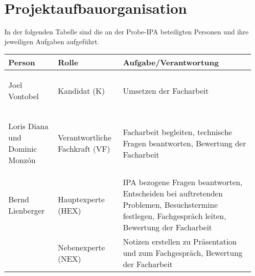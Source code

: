 \chapter{Projektaufbauorganisation}\label{ch:projektaufbauorganisation}
In der folgenden Tabelle sind die an der Probe-IPA beteiligten Personen und ihre jeweiligen Aufgaben aufgeführt.

\renewcommand{\arraystretch}{1.5}
\begin{longtable}{|p{}|p{}|p{}|}
    \hline
    \textbf{Person} & \textbf{Rolle} & \textbf{Aufgabe/Verantwortung} \\
    \hline
    \hypertarget{k}{Joel Vontobel} & Kandidat (K) & Umsetzen der Facharbeit \\
    \hline
    \hypertarget{vf}{Loris Diana und Dominic Monzón} & Verantwortliche Fachkraft (VF) & Facharbeit begleiten, technische Fragen beantworten, Bewertung der Facharbeit \\
    \hline
    \hypertarget{hex}{Bernd Lienberger} & Hauptexperte (HEX) & IPA bezogene Fragen beantworten, Entscheiden bei auftretenden Problemen, Besuchstermine festlegen, Fachgespräch leiten, Bewertung der Facharbeit \\
    \hline
    \hypertarget{nex}{} & Nebenexperte (NEX) & Notizen erstellen zu Präsentation und zum Fachgespräch, Bewertung der Facharbeit \\
    \hline
\end{longtable}
\renewcommand{\arraystretch}{1}
